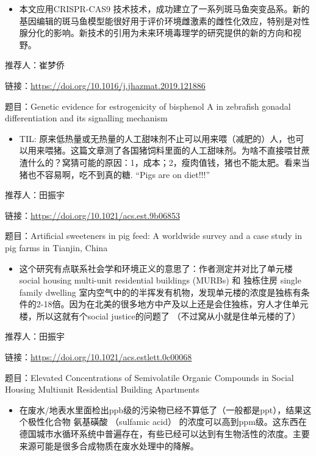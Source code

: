 \documentclass[
]{book}
\providecommand{\tightlist}{%
  \setlength{\itemsep}{0pt}\setlength{\parskip}{0pt}}
\begin{document}
\begin{itemize}
\tightlist
\item
  本文应用CRISPR-CAS9 技术技术，成功建立了一系列斑马鱼突变品系。新的基因编辑的斑马鱼模型能很好用于评价环境雌激素的雌性化效应，特别是对性腺分化的影响。新技术的引用为未来环境毒理学的研究提供的新的方向和视野。
\end{itemize}

推荐人：崔梦侨

链接：\url{https://doi.org/10.1016/j.jhazmat.2019.121886}

题目：Genetic evidence for estrogenicity of bisphenol A in zebrafish gonadal differentiation and its signalling mechanism

\begin{itemize}
\tightlist
\item
  TIL: 原来低热量或无热量的人工甜味剂不止可以用来喂（减肥的）人，也可以用来喂猪。这篇文章测了各国猪饲料里面的人工甜味剂。为啥不直接喂甘蔗渣什么的？窝猜可能的原因：1，成本；2，瘦肉值钱，猪也不能太肥。看来当猪也不容易啊，吃不到真的糖. ``Pigs are on diet!!!''
\end{itemize}

推荐人：田振宇

链接：\url{https://doi.org/10.1021/acs.est.9b06853}

题目：Artificial sweeteners in pig feed: A worldwide survey and a case study in pig farms in Tianjin, China

\begin{itemize}
\tightlist
\item
  这个研究有点联系社会学和环境正义的意思了：作者测定并对比了单元楼 social housing multi-unit residential buildings (MURBs) 和 独栋住房 single family dwelling 室内空气中的的半挥发有机物，发现单元楼的浓度是独栋有条件的2-18倍。因为在北美的很多地方中产及以上还是会住独栋，穷人才住单元楼，所以这就有个social justice的问题了 （不过窝从小就是住单元楼的了）
\end{itemize}

推荐人：田振宇

链接：\url{https://doi.org/10.1021/acs.estlett.0c00068}

题目：Elevated Concentrations of Semivolatile Organic Compounds in Social Housing Multiunit Residential Building Apartments

\begin{itemize}
\tightlist
\item
  在废水/地表水里面检出ppb级的污染物已经不算低了（一般都是ppt），结果这个极性化合物 氨基磺酸 （sulfamic acid） 的浓度可以高到ppm级。这东西在德国城市水循环系统中普遍存在，有些已经可以达到有生物活性的浓度。主要来源可能是很多合成物质在废水处理中的降解。
\end{itemize}
\end{document}
